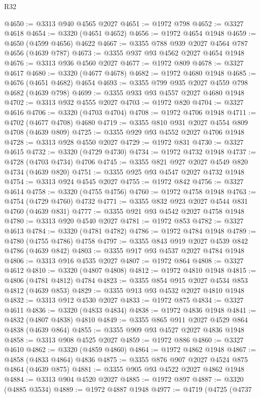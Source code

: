 \begin{lexlean}{R32}
\begin{coremodule}
@4650 := @3313 @940 @4565 @2027
@4651 := @1972 @798
@4652 := @3327 @4618
@4654 := @3320 (@4651 @4652)
@4656 := @1972 @4654 @1948
@4659 := @4650 (@4599 @4656) @4622
@4667 := @3355 @788 @939 @2027 @4564 @787 @4656 (@4639 @787)
@4673 := @3355 @937 @93 @4562 @2027 @4654 @1948
@4676 := @3313 @936 @4560 @2027
@4677 := @1972 @809
@4678 := @3327 @4617
@4680 := @3320 (@4677 @4678)
@4682 := @1972 @4680 @1948
@4685 := @4676 (@4651 @4682) @4654
@4693 := @3355 @799 @935 @2027 @4559 @798 @4682 (@4639 @798)
@4699 := @3355 @933 @93 @4557 @2027 @4680 @1948
@4702 := @3313 @932 @4555 @2027
@4703 := @1972 @820
@4704 := @3327 @4616
@4706 := @3320 (@4703 @4704)
@4708 := @1972 @4706 @1948
@4711 := @4702 (@4677 @4708) @4680
@4719 := @3355 @810 @931 @2027 @4554 @809 @4708 (@4639 @809)
@4725 := @3355 @929 @93 @4552 @2027 @4706 @1948
@4728 := @3313 @928 @4550 @2027
@4729 := @1972 @831
@4730 := @3327 @4615
@4732 := @3320 (@4729 @4730)
@4734 := @1972 @4732 @1948
@4737 := @4728 (@4703 @4734) @4706
@4745 := @3355 @821 @927 @2027 @4549 @820 @4734 (@4639 @820)
@4751 := @3355 @925 @93 @4547 @2027 @4732 @1948
@4754 := @3313 @924 @4545 @2027
@4755 := @1972 @842
@4756 := @3327 @4614
@4758 := @3320 (@4755 @4756)
@4760 := @1972 @4758 @1948
@4763 := @4754 (@4729 @4760) @4732
@4771 := @3355 @832 @923 @2027 @4544 @831 @4760 (@4639 @831)
@4777 := @3355 @921 @93 @4542 @2027 @4758 @1948
@4780 := @3313 @920 @4540 @2027
@4781 := @1972 @853
@4782 := @3327 @4613
@4784 := @3320 (@4781 @4782)
@4786 := @1972 @4784 @1948
@4789 := @4780 (@4755 @4786) @4758
@4797 := @3355 @843 @919 @2027 @4539 @842 @4786 (@4639 @842)
@4803 := @3355 @917 @93 @4537 @2027 @4784 @1948
@4806 := @3313 @916 @4535 @2027
@4807 := @1972 @864
@4808 := @3327 @4612
@4810 := @3320 (@4807 @4808)
@4812 := @1972 @4810 @1948
@4815 := @4806 (@4781 @4812) @4784
@4823 := @3355 @854 @915 @2027 @4534 @853 @4812 (@4639 @853)
@4829 := @3355 @913 @93 @4532 @2027 @4810 @1948
@4832 := @3313 @912 @4530 @2027
@4833 := @1972 @875
@4834 := @3327 @4611
@4836 := @3320 (@4833 @4834)
@4838 := @1972 @4836 @1948
@4841 := @4832 (@4807 @4838) @4810
@4849 := @3355 @865 @911 @2027 @4529 @864 @4838 (@4639 @864)
@4855 := @3355 @909 @93 @4527 @2027 @4836 @1948
@4858 := @3313 @908 @4525 @2027
@4859 := @1972 @886
@4860 := @3327 @4610
@4862 := @3320 (@4859 @4860)
@4864 := @1972 @4862 @1948
@4867 := @4858 (@4833 @4864) @4836
@4875 := @3355 @876 @907 @2027 @4524 @875 @4864 (@4639 @875)
@4881 := @3355 @905 @93 @4522 @2027 @4862 @1948
@4884 := @3313 @904 @4520 @2027
@4885 := @1972 @897
@4887 := @3320 (@4885 @3534)
@4889 := @1972 @4887 @1948
@4977 := @4719
    (@4725
      (@4737

\end{coremodule}
\end{lexlean}
